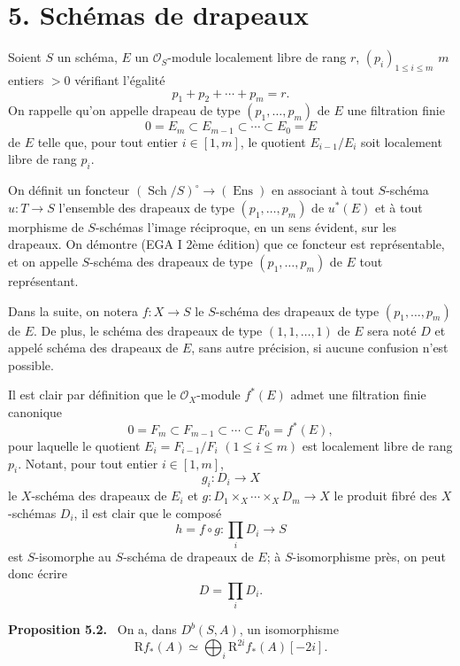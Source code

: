 \documentclass[11pt]{article}
\newenvironment{statement}[1]{\par\medskip\noindent\textbf{#1.}\ }{\par\medskip}
\newcommand{\R}{\mathrm{R}}\newcommand{\RHomCore}{\mathrm{RHom}}
\providecommand{\R}{\mathrm R}
\begin{document}
\section*{5. Schémas de drapeaux}

Soient $S$ un schéma, $E$ un $\mathcal O_S$-module localement libre de rang $r$, $(p_i)_{1\le i\le m}$ $m$ entiers $>0$ vérifiant l'égalité
\[
p_1+p_2+\cdots+p_m=r.
\]
On rappelle qu'on appelle drapeau de type $(p_1,\ldots,p_m)$ de $E$ une filtration finie
\[
0=E_m\subset E_{m-1}\subset\cdots\subset E_0=E
\]
de $E$ telle que, pour tout entier $i\in[1,m]$, le quotient $E_{i-1}/E_i$ soit localement libre de rang $p_i$.

On définit un foncteur $(\operatorname{Sch}/S)^\circ\to(\operatorname{Ens})$ en associant à tout $S$-schéma $u:T\to S$ l'ensemble des drapeaux de type $(p_1,\ldots,p_m)$ de $u^*(E)$ et à tout morphisme de $S$-schémas l'image réciproque, en un sens évident, sur les drapeaux. On démontre (EGA I 2ème édition) que ce foncteur est représentable, et on appelle $S$-schéma des drapeaux de type $(p_1,\ldots,p_m)$ de $E$ tout représentant.

Dans la suite, on notera $f:X\to S$ le $S$-schéma des drapeaux de type $(p_1,\ldots,p_m)$ de $E$. De plus, le schéma des drapeaux de type $(1,1,\ldots,1)$ de $E$ sera noté $D$ et appelé schéma des drapeaux de $E$, sans autre précision, si aucune confusion n'est possible.

Il est clair par définition que le $\mathcal O_X$-module $f^*(E)$ admet une filtration finie canonique
\[
0=F_m\subset F_{m-1}\subset\cdots\subset F_0=f^*(E),
\]
pour laquelle le quotient $E_i=F_{i-1}/F_i$ $(1\le i\le m)$ est localement libre de rang $p_i$. Notant, pour tout entier $i\in[1,m]$,
\[
g_i:D_i\to X
\]
le $X$-schéma des drapeaux de $E_i$ et $g:D_1\times_X\cdots\times_X D_m\to X$ le produit fibré des $X$-schémas $D_i$, il est clair que le composé
\[
h=f\circ g:\prod_iD_i\to S
\tag{5.1}
\]
est $S$-isomorphe au $S$-schéma de drapeaux de $E$; à $S$-isomorphisme près, on peut donc écrire
\[
D=\prod_iD_i.
\]

\begin{statement}{Proposition 5.2}
On a, dans $D^b(S,A)$, un isomorphisme
\[
\R f_*(A)\simeq\bigoplus_i \R^{2i}f_*(A)[-2i].
\]
\end{statement}
\end{document}
